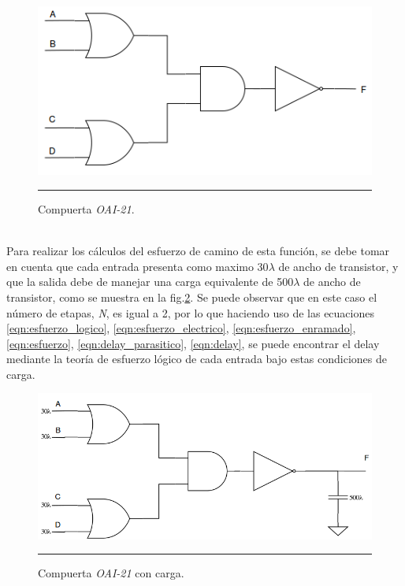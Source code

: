 \documentclass[12pt,a4paper]{article} %
\begin{document}
\begin{figure}[htbp]
  \centering
    \includegraphics[scale=0.5]{./OAI21.png}
    \rule{35em}{0.5pt}
  \caption[IdealvsSim]{Compuerta \textit{OAI-21}.}
  \label{fig:OAI21}
\end{figure}\\

Para realizar los cálculos del esfuerzo de camino de esta función, se debe tomar en cuenta que cada entrada presenta como maximo 30$\lambda$ de ancho de transistor, y que la salida debe de manejar una carga equivalente de 500$\lambda$ de ancho de transistor, como se muestra en la fig.\ref{fig:OAI21_Cargas}. Se puede observar que en este caso el número de etapas, \textit{N}, es igual a 2, por lo que haciendo uso de las ecuaciones \ref{eqn:esfuerzo_logico}, \ref{eqn:esfuerzo_electrico}, \ref{eqn:esfuerzo_enramado}, \ref{eqn:esfuerzo}, \ref{eqn:delay_parasitico}, \ref{eqn:delay}, se puede encontrar el delay mediante la teoría de esfuerzo lógico de cada entrada bajo estas condiciones de carga.\\

\begin{figure}[htbp]
  \centering
    \includegraphics[scale=0.5]{./OAI21_Cargas.png}
    \rule{35em}{0.5pt}
  \caption[IdealvsSim]{Compuerta \textit{OAI-21} con carga.}
  \label{fig:OAI21_Cargas}
\end{figure}\\
\end{document}
